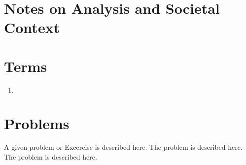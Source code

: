 \section{Notes on Analysis and Societal Context}
\label{sec:SocCont4}



\section{Terms}
\label{sec:terms4}

\begin{enumerate}
    \item
\end{enumerate}


%
%
%


\section*{Problems}
%
\begin{prob}
\label{prob1}
A given problem or Excercise is described here. The
problem is described here. The problem is described here.
\end{prob}



